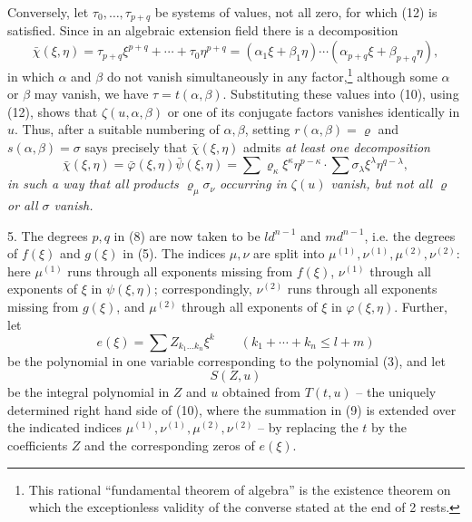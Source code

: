 \documentclass[11pt]{article}
\begin{document}
Conversely, let $\tau_0,\ldots,\tau_{p+q}$ be systems of values, not all zero, for which (12) is satisfied. Since in an algebraic extension field there is a decomposition
\begin{equation}
 \bar\chi(\xi,\eta)=\tau_{p+q}\xi^{p+q}+\cdots+\tau_0\eta^{p+q}
=(\alpha_1\xi+\beta_1\eta)\cdots(\alpha_{p+q}\xi+\beta_{p+q}\eta),
\tag{12}
\end{equation}
in which $\alpha$ and $\beta$ do not vanish simultaneously in any factor,\footnote{This rational ``fundamental theorem of algebra'' is the existence theorem on which the exceptionless validity of the converse stated at the end of 2 rests.} although some $\alpha$ or $\beta$ may vanish, we have $\tau=t(\alpha,\beta)$. Substituting these values into (10), using (12), shows that $\zeta(u,\alpha,\beta)$ or one of its conjugate factors vanishes identically in $u$. Thus, after a suitable numbering of $\alpha,\beta$, setting $r(\alpha,\beta)=\varrho$ and $s(\alpha,\beta)=\sigma$ says precisely that $\bar\chi(\xi,\eta)$ admits \emph{at least one decomposition}
\begin{equation}
\bar\chi(\xi,\eta)=\bar\varphi(\xi,\eta)\bar\psi(\xi,\eta)
=\sum \varrho_\kappa\xi^\kappa\eta^{p-\kappa}\cdot\sum \sigma_\lambda\xi^\lambda\eta^{q-\lambda},
\tag{13}
\end{equation}
\emph{in such a way that all products $\varrho_\mu\sigma_\nu$ occurring in $\zeta(u)$ vanish, but not all $\varrho$ or all $\sigma$ vanish.}

5. The degrees $p,q$ in (8) are now taken to be $ld^{n-1}$ and $md^{n-1}$, i.e. the degrees of $f(\xi)$ and $g(\xi)$ in (5). The indices $\mu,\nu$ are split into $\mu^{(1)},\nu^{(1)},\mu^{(2)},\nu^{(2)}$: here $\mu^{(1)}$ runs through all exponents missing from $f(\xi)$, $\nu^{(1)}$ through all exponents of $\xi$ in $\psi(\xi,\eta)$; correspondingly, $\nu^{(2)}$ runs through all exponents missing from $g(\xi)$, and $\mu^{(2)}$ through all exponents of $\xi$ in $\varphi(\xi,\eta)$. Further, let
\[
 e(\xi)=\sum Z_{k_1\ldots k_n}\xi^k\qquad(k_1+\cdots+k_n\le l+m)
\]
be the polynomial in one variable corresponding to the polynomial (3), and let
\[
 S(Z,u)
\]
be the integral polynomial in $Z$ and $u$ obtained from $T(t,u)$ -- the uniquely determined right hand side of (10), where the summation in (9) is extended over the indicated indices $\mu^{(1)},\nu^{(1)},\mu^{(2)},\nu^{(2)}$ -- by replacing the $t$ by the coefficients $Z$ and the corresponding zeros of $e(\xi)$.
\end{document}
